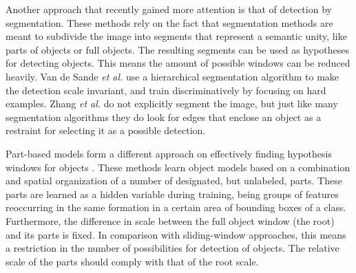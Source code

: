 Another approach that recently gained more attention is that of detection by segmentation.\cite{van2011segmentation,zhang2010free} These methods rely on the fact that segmentation methods are meant to subdivide the image into segments that represent a semantic unity, like parts of objects or full objects. The resulting segments can be used as hypotheses for detecting objects. This means the amount of possible windows can be reduced heavily. Van de Sande \emph{et al.} \cite{van2011segmentation} use a hierarchical segmentation algorithm to make the detection scale invariant, and train discriminatively by focusing on hard examples. Zhang \emph{et al.} \cite{zhang2010free} do not explicitly segment the image, but just like many segmentation algorithms they do look for edges that enclose an object as a restraint for selecting it as a possible detection.

Part-based models form a different approach on effectively finding hypothesis windows for objects \cite{felzenszwalb2010object}. These methods learn object models based on a combination and spatial organization of a number of designated, but unlabeled, parts. These parts are learned as a hidden variable during training, being groups of features reoccurring in the same formation in a certain area of bounding boxes of a class. Furthermore, the difference in scale between the full object window (the root) and its parts is fixed. In comparison with sliding-window approaches, this means a restriction in the number of possibilities for detection of objects. The relative scale of the parts should comply with that of the root scale. 

\begin{figure}[hbt]
    \centering
\end{figure}


